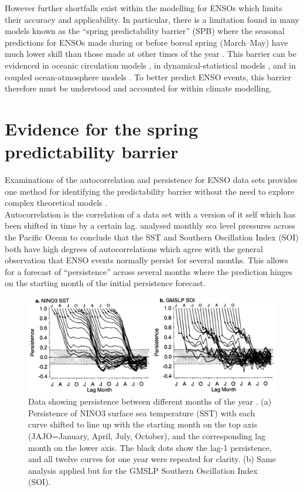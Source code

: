 \documentclass[12pt, onecolumn]{revtex4}    %
\begin{document}
However further shortfalls exist within the modelling for ENSOs which limits their accuracy and applicability. In particular, there is a limitation found in many models known as the ``spring predictability barrier'' (SPB) where the seasonal predictions for ENSOs made during or before boreal spring (March--May) have much lower skill than those made at other times of the year \citep{torrence1998annual}. This barrier can be evidenced in oceanic circulation models \citep{latif1992much}, in dynamical-statistical models \citep{balmaseda1994enso}, and in coupled ocean-atmosphere models \citep{goswami1991predictability, xue1994prediction}. To better predict ENSO events, this barrier therefore must be understood and accounted for within climate modelling.

\section{Evidence for the spring predictability barrier}

Examinations of the autocorrelation and persistence for ENSO data sets provides one method for identifying the predictability barrier without the need to explore complex theoretical models \citep{torrence1998annual}. \\

Autocorrelation is the correlation of a data set with a version of it self which has been shifted in time by a certain lag. \cite{trenberth1976spatial} analysed monthly sea level pressures across the Pacific Ocean to conclude that the SST and Southern Oscillation Index (SOI) both have high degrees of autocorrelations which agree with the general observation that ENSO events normally persist for several months. This allows for a forecast of ``persistence'' across several months where the prediction hinges on the starting month of the initial persistence forecast. \\

\begin{figure}
\includegraphics[width=\textwidth]{data/persistence_sst_soi}
\caption[Persistence]{Data showing persistence between different months of the year \citep{torrence1998annual}. (a) Persistence of NINO3 surface sea temperature (SST) with each curve shifted to line up with the starting month on the top axis (JAJO=January, April, July, October), and the corresponding lag month on the lower axis. The black dots show the lag-1 persistence, and all twelve curves for one year were repeated for clarity. (b) Same analysis applied but for the GMSLP Southern Oscillation Index (SOI). }
\label{fig:persistence_sst_soi}
\end{figure}
\end{document}

